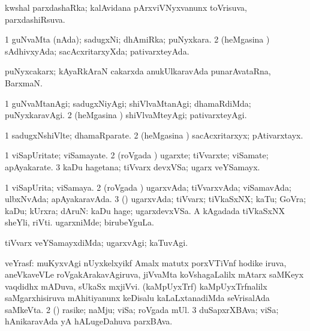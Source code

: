 {{{{{{{{\bentry
{} 
\gl{\gu}
\expl{}
\bmng
 kwshal parxdashaRka; kalAvidana pArxviVNyxvanunx toVrisuva, parxdashiRsuva. 
\emng
\eentry

\bentry
{} 
\gl{\nA}
\expl{}
\bmng
\emng
\eentry

\bentry
{} 
\gl{\gu}
\expl{}
\bmng
\bnum
\num{1} guNvaMta (nAda); sadugxNi; dhAmiRka; puNyxkara. 
\num{2} (heMgasina \vi) sAdhivxyAda; sacAcxritarxyXda; pativarxteyAda. 
\enum
\emng
\eentry

\bentry
{}
\gl{\nA}
\expl{}
\bmng
 puNyxcakarx; kAyaRkAraN cakarxda anukUlkaravAda punarAvataRna, BarxmaN. 
\emng
\eentry

\bentry
{} 
\gl{\kirxvi}
\expl{}
\bmng
\bnum
\num{1} guNvaMtanAgi; sadugxNiyAgi; shiVlvaMtanAgi; dhamaRdiMda; puNyxkaravAgi. 
\num{2} (heMgasina \vi) shiVlvaMteyAgi; pativarxteyAgi. 
\enum
\emng
\eentry

\bentry 
{} 
\gl{\nA}
\expl{}
\bmng
\bnum
\num{1} sadugxNshiVlte; dhamaRparate. 
\num{2} (heMgasina \vi) sacAcxritarxyx; pAtivarxtayx. 
\enum
\emng
\eentry

\bentry 
{} 
\gl{\nA}
\expl{}
\bmng
\bnum
\num{1} viSapUritate; viSamayate. 
\num{2} (roVgada \vi) ugarxte; tiVvarxte; viSamate; apAyakarate. 
\num{3} kaDu hagetana; tiVvarx devxVSa; ugarx veYSamayx. 
\enum
\emng
\eentry

\bentry
{} 
\gl{\gu}
\expl{}
\bmng
\bnum
\num{1} viSapUrita; viSamaya. 
\num{2} (roVgada \vi) ugarxvAda; tiVvarxvAda; viSamavAda; ulbxNvAda; apAyakaravAda. 
\num{3} (\rUpa) ugarxvAda; tiVvarx; tiVkaSxNX; kaTu; GoVra; kaDu; kUrxra; dAruN:  kaDu hage; ugarxdevxVSa.  A kAgadada tiVkaSxNX sheYli, riVti.  ugarxniMde; birubeYguLa. 
\enum
\emng
\eentry

\bentry 
{} 
\gl{\kirxvi}
\expl{}
\bmng
 tiVvarx veYSamayxdiMda; ugarxvAgi; kaTuvAgi. 
\emng
\eentry

\bentry 
{} 
\gl{\nA}
\expl{}
\bmng
\bnum
{} 
\banum
{} veYrasf: muKyxvAgi nUyxkelxyikf Amalx matutx porxVTiVnf hodike iruva, aneVkaveVLe roVgakArakavAgiruva, jiVvaMta koVshagaLalilx mAtarx saMKeyx vaqdidhx mADuva, sUkaSx mxjiVvi. 
 (kaMpUyxTrf) kaMpUyxTrfnalilx saMgarxhisiruva mAhitiyanunx keDisalu kaLaLxtanadiMda seVrisalAda saMkeVta. 
\eanum
\numie
\num{2} (\pArxparx) rasike; naMju; viSa; roVgada mUl. 
\num{3} duSapxrXBAva; viSa; hAnikaravAda yA hALugeDahuva parxBAva. 
\enum
\emng
\eentry

}}}}}}}}
